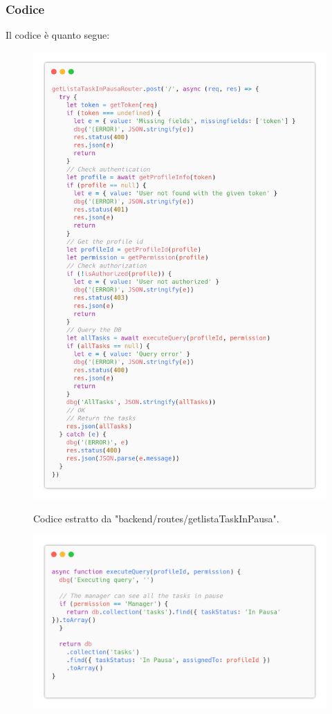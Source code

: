 \documentclass{report}
\begin{document}
\subsubsection*{Codice}

Il codice è quanto segue:
\begin{figure}[H]
	\centering\includegraphics[width=1\textwidth]{images/code_in_pausa.png}
	
	Codice estratto da "backend/routes/getlistaTaskInPausa".
\end{figure}
\begin{figure}[H]
	\centering\includegraphics[width=1\textwidth]{images/code_in_paus2.png}
\end{figure}
\end{document}
